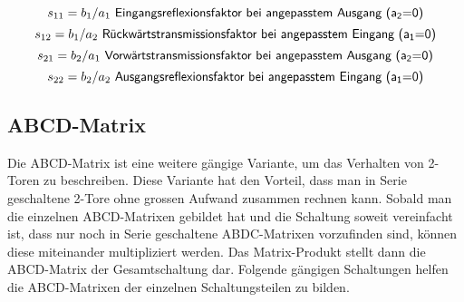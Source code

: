 \begin{equation}\label{equ:def_s11}
	s_{11} = b_1/a_1\textsf{ Eingangsreflexionsfaktor bei angepasstem Ausgang (a\textsubscript{2}=0)}
\end{equation}
\begin{equation}\label{equ:def_s12}
	s_{12} = b_1/a_2\textsf{ Rückwärtstransmissionsfaktor bei angepasstem Eingang (a\textsubscript{1}=0)}
\end{equation}
\begin{equation}\label{equ:def_s21}
	s_{21} = b_2/a_1\textsf{ Vorwärtstransmissionsfaktor bei angepasstem Ausgang (a\textsubscript{2}=0)}
\end{equation}
\begin{equation}\label{equ:def_s22}
	s_{22} = b_2/a_2\textsf{ Ausgangsreflexionsfaktor bei angepasstem Eingang (a\textsubscript{1}=0)}
\end{equation}
\newpage

\subsection{ABCD-Matrix}\label{ABCD-Matrix}
Die ABCD-Matrix ist eine weitere gängige Variante, um das Verhalten von 2-Toren zu beschreiben. Diese Variante hat den Vorteil, dass man in Serie 
geschaltene 2-Tore ohne grossen Aufwand zusammen rechnen kann. Sobald man die einzelnen ABCD-Matrixen gebildet hat und die Schaltung soweit vereinfacht ist, dass nur noch in Serie geschaltene ABDC-Matrixen vorzufinden sind, können diese miteinander multipliziert werden. Das Matrix-Produkt stellt dann die ABCD-Matrix der Gesamtschaltung dar. Folgende gängigen Schaltungen helfen die ABCD-Matrixen der einzelnen Schaltungsteilen zu bilden.

